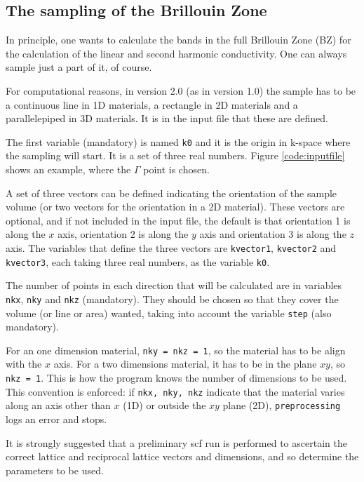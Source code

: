 \documentclass[a4paper,12pt]{report}
\begin{document}
 \subsection{The sampling of the Brillouin Zone}

 In principle, one wants to calculate the bands in the full Brillouin Zone (BZ)
 for the calculation of the linear and second harmonic conductivity.
 One can always sample just a part of it, of course.

 For computational reasons, in version 2.0 (as in version 1.0) the sample has to be
 a continuous line in 1D materials, a rectangle in 2D materials and a parallelepiped in 3D materials.
 It is in the input file that these are defined.

 The first variable (mandatory) is named \verb|k0| and it is the origin in k-space
 where the sampling will start.
 It is a set of three real numbers.
 Figure \ref{code:inputfile} shows an example, where the $\Gamma$ point is chosen.

 A set of three vectors can be defined indicating the orientation of the sample volume
 (or two vectors for the orientation in a 2D material).
 These vectors are optional, and if not included in the input file,
 the default is that orientation 1 is along the $x$ axis, orientation 2 is along the $y$
 axis and orientation 3 is along the $z$ axis.
 The variables that define the three vectors are \verb|kvector1|, \verb|kvector2| and \verb|kvector3|,
 each taking three real numbers, as the variable \verb|k0|.

 The number of points in each direction that will be calculated are in variables
 \verb|nkx|, \verb|nky| and \verb|nkz| (mandatory).
 They should be chosen so that they cover the volume (or line or area) wanted,
 taking into account the variable \verb|step| (also mandatory).

 For an one dimension material, \verb|nky = nkz = 1|, so the material has to be align with the $x$ axis.
 For a two dimensions material, it has to be in the plane $xy$, so \verb|nkz = 1|.
 This is how the program knows the number of dimensions to be used.
 This convention is enforced: if \verb|nkx, nky, nkz| indicate that the material varies along an axis
 other than $x$ (1D) or outside the $xy$ plane (2D), \verb|preprocessing| logs an error and stops.

 It is strongly suggested that a preliminary scf run is performed to ascertain the correct
 lattice and reciprocal lattice vectors and dimensions,
 and so determine the parameters to be used.
\end{document}
